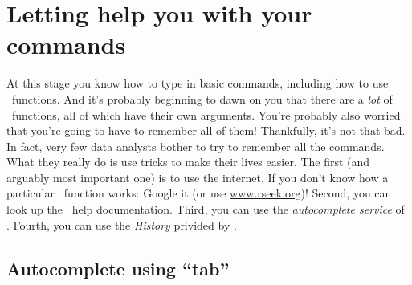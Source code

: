 

\section{Letting \Rstudio help you with your commands\label{sec:Rstudio1}}

At this stage you know how to type in basic commands, including how to use \R\ functions. And it's probably beginning to dawn on you that there are a {\it lot} of \R\ functions, all of which have their own arguments. You're probably also worried that you're going to have to remember all of them! Thankfully, it's not that bad. In fact, very few data analysts bother to try to remember all the commands. What they really do is use tricks to make their lives easier. The first (and arguably most important one) is to use the internet. If you don't know how a particular \R\ function works: Google it (or use \url{www.rseek.org})!  Second, you can look up the \R\ help documentation. Third, you can use the \textit{autocomplete service} of \Rstudio. Fourth, you can use the \textit{History} privided by \Rstudio.


\subsection{Autocomplete using ``tab''}

